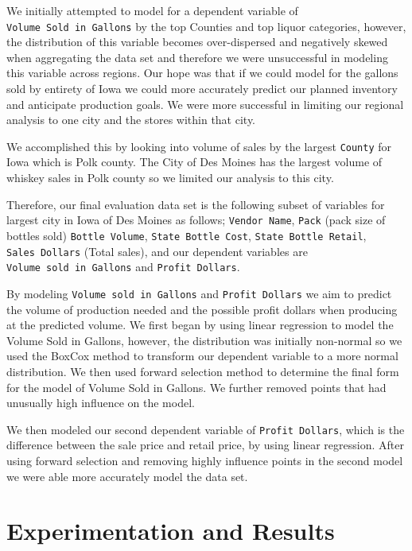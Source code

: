\documentclass[]{elsarticle} %
\begin{document}
We initially attempted to model for a dependent variable of
\texttt{Volume\ Sold\ in\ Gallons} by the top Counties and top liquor
categories, however, the distribution of this variable becomes
over-dispersed and negatively skewed when aggregating the data set and
therefore we were unsuccessful in modeling this variable across regions.
Our hope was that if we could model for the gallons sold by entirety of
Iowa we could more accurately predict our planned inventory and
anticipate production goals. We were more successful in limiting our
regional analysis to one city and the stores within that city.

We accomplished this by looking into volume of sales by the largest
\texttt{County} for Iowa which is Polk county. The City of Des Moines
has the largest volume of whiskey sales in Polk county so we limited our
analysis to this city.

Therefore, our final evaluation data set is the following subset of
variables for largest city in Iowa of Des Moines as follows;
\texttt{Vendor\ Name}, \texttt{Pack} (pack size of bottles sold)
\texttt{Bottle\ Volume}, \texttt{State\ Bottle\ Cost},
\texttt{State\ Bottle\ Retail}, \texttt{Sales\ Dollars} (Total sales),
and our dependent variables are \texttt{Volume\ sold\ in\ Gallons} and
\texttt{Profit\ Dollars}.

By modeling \texttt{Volume\ sold\ in\ Gallons} and
\texttt{Profit\ Dollars} we aim to predict the volume of production
needed and the possible profit dollars when producing at the predicted
volume. We first began by using linear regression to model the Volume
Sold in Gallons, however, the distribution was initially non-normal so
we used the BoxCox method to transform our dependent variable to a more
normal distribution. We then used forward selection method to determine
the final form for the model of Volume Sold in Gallons. We further
removed points that had unusually high influence on the model.

We then modeled our second dependent variable of
\texttt{Profit\ Dollars}, which is the difference between the sale price
and retail price, by using linear regression. After using forward
selection and removing highly influence points in the second model we
were able more accurately model the data set.

\section{Experimentation and Results}\label{experimentation-and-results}
\end{document}
